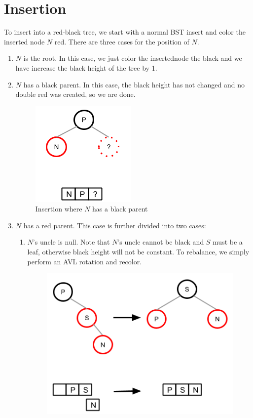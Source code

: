 \documentclass[12pt]{article}
\begin{document}
\section*{Insertion}
To insert into a red-black tree, we start with a normal BST insert and color the inserted node $N$ red. There are three cases for the position of $N$.
\begin{enumerate}
  \item $N$ is the root. In this case, we just color the insertednode the black and we have increase the black height of the tree by 1.
  \item $N$ has a black parent. In this case, the black height has not changed and no double red was created, so we are done.
  \begin{figure}[h!]
    \centering
    \includegraphics[scale=0.75]{pics/red_black_tree/ins_bpar}
    \caption{Insertion where $N$ has a black parent}
  \end{figure}
  \item $N$ has a red parent. This case is further divided into two cases:
  \begin{enumerate}
    \item $N$'s uncle is null. Note that $N$'s uncle cannot be black and $S$ must be a leaf, otherwise black height will not be constant. To rebalance, we simply perform an AVL rotation and recolor.
    \begin{figure}[h!]
      \centering
      \includegraphics[scale=0.75]{pics/red_black_tree/ins_rpar_bunc_rr}

\end{figure}
\end{enumerate}
\end{enumerate}
\end{document}
